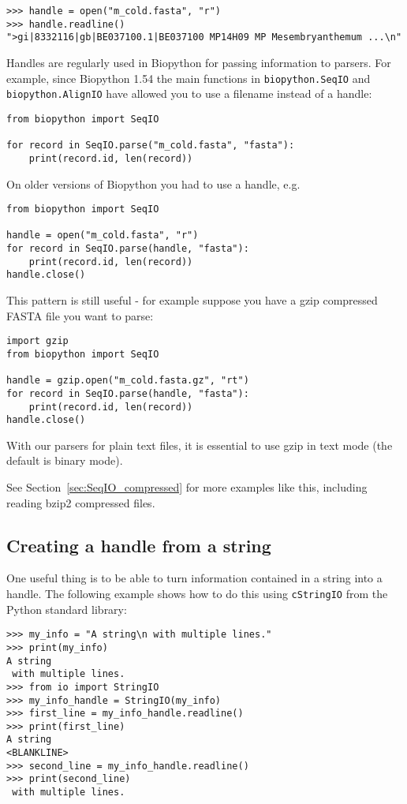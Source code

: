 \begin{verbatim}
>>> handle = open("m_cold.fasta", "r")
>>> handle.readline()
">gi|8332116|gb|BE037100.1|BE037100 MP14H09 MP Mesembryanthemum ...\n"
\end{verbatim}

Handles are regularly used in Biopython for passing information to parsers.
For example, since Biopython 1.54 the main functions in \verb|biopython.SeqIO|
and \verb|biopython.AlignIO| have allowed you to use a filename instead of a
handle:

\begin{verbatim}
from biopython import SeqIO

for record in SeqIO.parse("m_cold.fasta", "fasta"):
    print(record.id, len(record))
\end{verbatim}

On older versions of Biopython you had to use a handle, e.g.

\begin{verbatim}
from biopython import SeqIO

handle = open("m_cold.fasta", "r")
for record in SeqIO.parse(handle, "fasta"):
    print(record.id, len(record))
handle.close()
\end{verbatim}

This pattern is still useful - for example suppose you have a gzip
compressed FASTA file you want to parse:

\begin{verbatim}
import gzip
from biopython import SeqIO

handle = gzip.open("m_cold.fasta.gz", "rt")
for record in SeqIO.parse(handle, "fasta"):
    print(record.id, len(record))
handle.close()
\end{verbatim}

With our parsers for plain text files, it is essential to use gzip in
text mode (the default is binary mode).

See Section~\ref{sec:SeqIO_compressed} for more examples like this,
including reading bzip2 compressed files.

\subsection{Creating a handle from a string}

One useful thing is to be able to turn information contained in a
string into a handle. The following example shows how to do this using
\verb|cStringIO| from the Python standard library:

\begin{verbatim}
>>> my_info = "A string\n with multiple lines."
>>> print(my_info)
A string
 with multiple lines.
>>> from io import StringIO
>>> my_info_handle = StringIO(my_info)
>>> first_line = my_info_handle.readline()
>>> print(first_line)
A string
<BLANKLINE>
>>> second_line = my_info_handle.readline()
>>> print(second_line)
 with multiple lines.
\end{verbatim}
